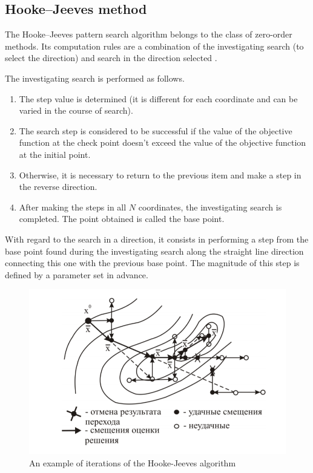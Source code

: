 \documentclass{svproc}
\begin{document}
\subsection{Hooke--Jeeves method}\label{SecHG}

The Hooke--Jeeves pattern search algorithm belongs to the class of zero-order methods. Its computation rules are a  combination of the investigating search (to select the direction) and search in the direction selected  \cite{fio_bib14, fio_bib15}.

The investigating search is performed as follows. 
\begin{enumerate} 
\item	The step value is determined (it is different for each coordinate and can be varied in the course  of search).  
\item	The search step is considered to be successful if the value of the objective function at the check  point doesn't exceed the value of the objective function at the initial point.  
\item	Otherwise, it is necessary to return to the previous item and make a step in the reverse direction.  
\item	After making the steps in all $N$ coordinates, the investigating search is completed. The point  obtained is called the base point. 
\end{enumerate}

With regard to the search in a direction, it consists in performing a step from the base point found  during the investigating search along the straight line direction connecting this one with the previous  base point. The magnitude of this step is defined by a parameter set in advance.

\begin{figure}[!h] 
	\begin{center} 
		\begin{minipage}[h]{0.8\linewidth} 
			\includegraphics[width=1\linewidth]{figure/fig1.png} 
			\caption{An example of iterations of the Hooke-Jeeves algorithm} %
			\label{fig:fig1} 
		\end{minipage} 
	\end{center} 
\end{figure}	
\end{document}
